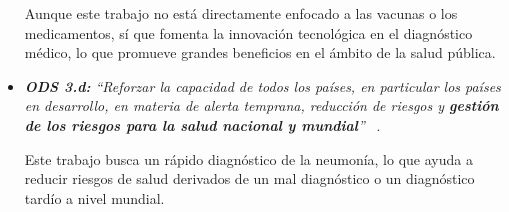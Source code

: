 \begin{itemize}
    Aunque este trabajo no está directamente enfocado a las vacunas o los medicamentos, sí que fomenta la innovación tecnológica en el diagnóstico médico, lo que promueve grandes beneficios en el ámbito de la salud pública.

    \item \textit{\textbf{ODS 3.d:}  ``Reforzar la capacidad de todos los países, en particular los países en desarrollo, en materia de alerta temprana, reducción de riesgos y \textbf{gestión de los riesgos para la salud nacional y mundial}''} ~\cite{ObDeSoSalud24}.

    Este trabajo busca un rápido diagnóstico de la neumonía, lo que ayuda a reducir riesgos de salud derivados de un mal diagnóstico o un diagnóstico tardío a nivel mundial. 
\end{itemize}

